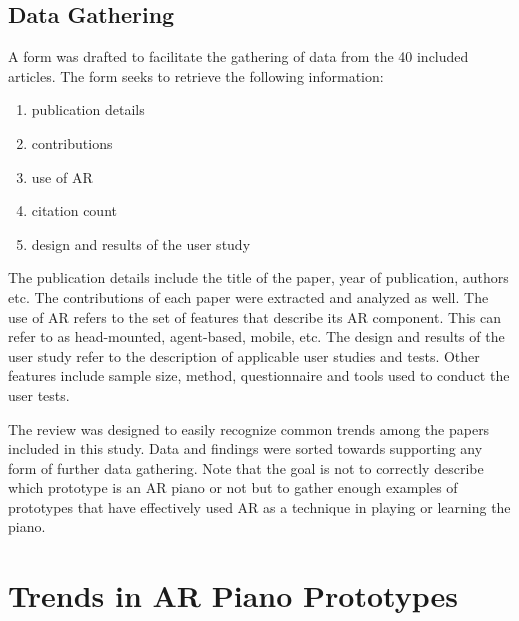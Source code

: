 \documentclass[sigchi, review]{acmart}
\begin{document}
\subsection{Data Gathering}
\label{subsec: gathering}
A form was drafted to facilitate the gathering of data from the 40 included articles. The form seeks to retrieve the following information: 
\begin{enumerate}
    \item publication details
    \item contributions
    \item use of AR
    \item citation count
    \item design and results of the user study
\end{enumerate}
The publication details include the title of the paper, year of publication, authors etc. The contributions of each paper were extracted and analyzed as well. The use of AR refers to the set of features that describe its AR component. This can refer to as head-mounted, agent-based, mobile, etc. The design and results of the user study refer to the description of applicable user studies and tests. Other features include sample size, method, questionnaire and tools used to conduct the user tests.

The review was designed to easily recognize common trends among the papers included in this study. Data and findings were sorted towards supporting any form of further data gathering. Note that the goal is not to correctly describe which prototype is an AR piano or not but to gather enough examples of prototypes that have effectively used AR as a technique in playing or learning the piano.  

\section{Trends in AR Piano Prototypes}
\end{document}
